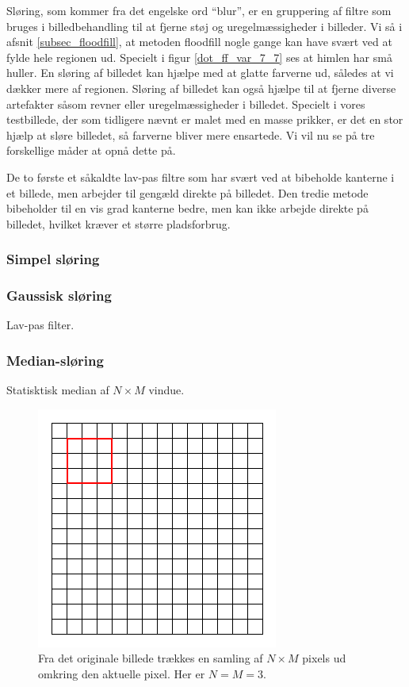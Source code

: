 {
Sløring, som kommer fra det engelske ord ``blur'', er en gruppering af filtre
som bruges i billedbehandling til at fjerne støj og uregelmæssigheder i
billeder. Vi så i afsnit \ref{subsec_floodfill}, at metoden floodfill
nogle gange kan have svært ved at fylde hele regionen ud. Specielt i
figur \ref{dot_ff_var_7_7} ses at himlen har små huller. En sløring af
billedet kan hjælpe med at glatte farverne ud, således at vi dækker mere
af regionen. Sløring af billedet kan også hjælpe til at fjerne diverse
artefakter såsom revner eller uregelmæssigheder i billedet. Specielt i
vores testbillede, der som tidligere nævnt er malet med en masse
prikker, er det en stor hjælp at sløre billedet, så farverne bliver mere
ensartede. Vi vil nu se på tre forskellige måder at opnå dette på.

De to første et såkaldte lav-pas filtre som har svært ved at bibeholde
kanterne i et billede, men arbejder til gengæld direkte på billedet. Den
tredie metode bibeholder til en vis grad kanterne bedre, men kan ikke
arbejde direkte på billedet, hvilket kræver et større pladsforbrug.

\subsubsection*{Simpel sløring}

\subsubsection*{Gaussisk sløring}
Lav-pas filter.

\subsubsection*{Median-sløring}
Statisktisk median af $N \times M$ vindue.

\begin{figure}[!h]
    \begin{center}
        \includegraphics[scale=0.42,angle=0]{afsnit/vores_implementation/billeder/sloering/red_pixel_box}
    \end{center}
    \caption[]{Fra det originale billede trækkes en samling af
    $N\times{M}$ pixels ud omkring den aktuelle pixel. Her er $N = M =
    3$.}
    \label{red_box_nxm}
\end{figure}

}
